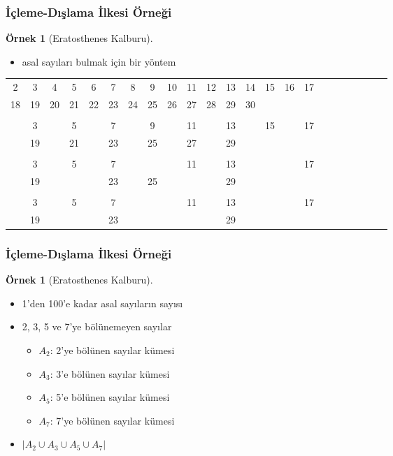 \documentclass[dvipsnames]{beamer}
\theoremstyle{definition}
\theoremstyle{example}
\newtheorem{ornek}[theorem]{Örnek}
\theoremstyle{plain}
\begin{document}
\begin{frame}
  \frametitle{İçleme-Dışlama İlkesi Örneği}

  \begin{ornek}[Eratosthenes Kalburu]
    \begin{itemize}
      \item asal sayıları bulmak için bir yöntem
    \end{itemize}

    \pause
    \begin{tiny}
    \begin{tabular}{ccccccccccccccccccccccc}
  2 &  3 &  4 &  5 &  6 &  7 &  8 &  9 & 10 & 11 & 12 & 13 & 14 & 15 & 16 & 17\\
 18 & 19 & 20 & 21 & 22 & 23 & 24 & 25 & 26 & 27 & 28 & 29 & 30\\
\\ \pause
  2 &  3 &    &  5 &    &  7 &    &  9 &    & 11 &    & 13 &    & 15 &    & 17\\
    & 19 &    & 21 &    & 23 &    & 25 &    & 27 &    & 29 & \\
\\  \pause
  2 &  3 &    &  5 &    &  7 &    &    &    & 11 &    & 13 &    &    &    & 17\\
    & 19 &    &    &    & 23 &    & 25 &    &    &    & 29 & \\
\\  \pause
  2 &  3 &    &  5 &    &  7 &    &    &    & 11 &    & 13 &    &    &    & 17\\
    & 19 &    &    &    & 23 &    &    &    &    &    & 29 & \\
    \end{tabular}
    \end{tiny}
  \end{ornek}
\end{frame}

\begin{frame}
  \frametitle{İçleme-Dışlama İlkesi Örneği}

  \begin{ornek}[Eratosthenes Kalburu]
    \begin{itemize}
      \item 1'den 100'e kadar asal sayıların sayısı
      \medskip

      \pause
      \item 2, 3, 5 ve 7'ye bölünemeyen sayılar
      \begin{itemize}
        \item $A_2$: 2'ye bölünen sayılar kümesi
        \item $A_3$: 3'e bölünen sayılar kümesi
        \item $A_5$: 5'e bölünen sayılar kümesi
        \item $A_7$: 7'ye bölünen sayılar kümesi
      \end{itemize}

      \pause
      \item $|A_2 \cup A_3 \cup A_5 \cup A_7|$
    \end{itemize}
  \end{ornek}
\end{frame}
\end{document}
